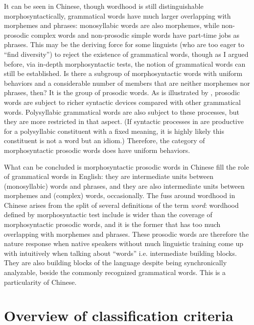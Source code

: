 \documentclass[UTF8, a4paper, oneside, scheme=plain]{ctexrep}
\newcommand*{\term}[1]{\emph{#1}}
\begin{document}
It can be seen in Chinese, 
though wordhood is still distinguishable morphosyntactically,
grammatical words have much larger overlapping with morphemes and phrases: 
monosyllabic words are also morphemes, 
while non-prosodic complex words and non-prosodic simple words have part-time jobs as phrases.
This may be the deriving force for some linguists 
(who are too eager to ``find diversity'')
to reject the existence of grammatical words,
though as I argued before,
via in-depth morphosyntactic tests,
the notion of grammatical words can still be established.
Is there a subgroup of morphosyntactic words 
with uniform behaviors and 
a considerable number of members that are neither morphemes nor phrases, then?
It is the group of prosodic words.
As is illustrated by ,
prosodic words are subject to richer syntactic devices 
compared with other grammatical words.
Polysyllabic grammatical words are also subject to these processes,
but they are more restricted in that aspect.
(If syntactic processes in  
are productive for a polysyllabic constituent with a fixed meaning,
it is highly likely this constituent is not a word but an idiom.)
Therefore, the category of morphosyntactic prosodic words does have uniform behaviors.

What can be concluded is 
morphosyntactic prosodic words in Chinese 
fill the role of grammatical words in English:
they are intermediate units between (monosyllabic) words and phrases,
and they are also intermediate units between morphemes and (complex) words,
occasionally.
The fuss around wordhood in Chinese 
arises from the split of several definitions of the term \term{word}:
wordhood defined by morphosyntactic test include is wider 
than the coverage of morphosyntactic prosodic words,
and it is the former that has too much overlapping with morphemes and phrases.
These prosodic words are therefore the nature response 
when native speakers without much linguistic training 
come up with intuitively when talking about ``words''
i.e. intermediate building blocks.
They are also building blocks of the language
despite being synchronically analyzable,
beside the commonly recognized grammatical words. 
This is a particularity of Chinese.

\section{Overview of classification criteria}
\end{document}
